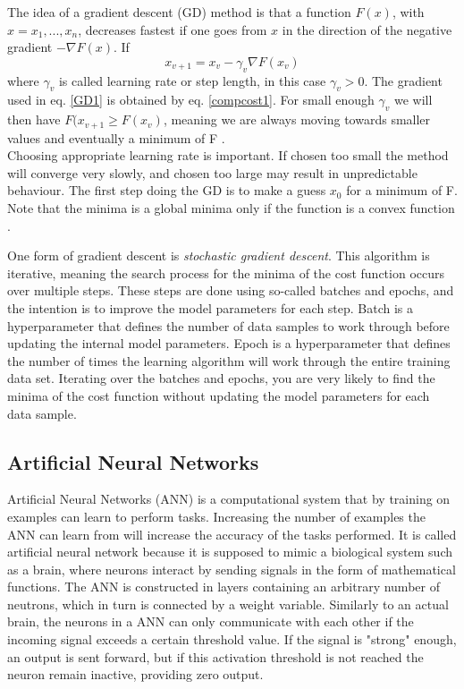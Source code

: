 \documentclass[a4paper,11pt,twocolumn]{article}
\begin{document}
The idea of a gradient descent (GD) method is that a function $F(x)$, with $x=x_1,...,x_n$, decreases fastest if one goes from $x$ in the direction of the negative gradient $-\nabla F(x)$. If 
\begin{equation}
x_{v+1}=x_v-\gamma_v\nabla F(x_v)
\label{GD1}
\end{equation}
where $\gamma_v$ is called learning rate or step length, in this case $\gamma_v>0$. The gradient used in eq. \eqref{GD1} is obtained by eq. \eqref{compcost1}. For small enough $\gamma_v$ we will then have $F(x_{v+1}\geq F(x_v)$, meaning we are always moving towards smaller values and eventually a minimum of F \cite{slides}.
\\ 
Choosing appropriate learning rate is important. If chosen too small the method will converge very slowly, and chosen too large may result in unpredictable behaviour. The first step doing the GD is to make a guess $x_0$ for a minimum of F. Note that the minima is a global minima only if the function is a convex function \cite{slides}. 

One form of gradient descent is \textit{stochastic gradient descent}. This algorithm is iterative, meaning the search process for the minima of the cost function occurs over multiple steps. These steps are done using so-called batches and epochs, and the intention is to improve the model parameters for each step. Batch is a hyperparameter that defines the number of data samples to work through before updating the internal model parameters. Epoch is a hyperparameter that defines the number of times the learning algorithm will work through the entire training data set. Iterating over the batches and epochs, you are very likely to find the minima of the cost function without updating the model parameters for each data sample.

\subsection{Artificial Neural Networks}

Artificial Neural Networks (ANN) is a computational system that by training on examples can learn to perform tasks. Increasing the number of examples the ANN can learn from will increase the accuracy of the tasks performed. It is called artificial neural network because it is supposed to mimic a biological system such as a brain, where neurons interact by sending signals in the form of mathematical functions. The ANN is constructed in layers containing an arbitrary number of neutrons, which in turn is connected by a weight variable. Similarly to an actual brain, the neurons in a ANN can only communicate with each other if the incoming signal exceeds a certain threshold value. If the signal is "strong" enough, an output is sent forward, but if this activation threshold is not reached the neuron remain inactive, providing zero output\cite{slides}. 
\\
\end{document}
